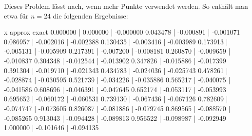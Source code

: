 Dieses Problem lässt nach, wenn mehr Punkte verwendet werden.
So enthält man etwa für $n = 24$ die folgenden Ergebnisse:
\begin{consoleoutput}
x                  approx          exact
0.000000        | 0.000000      | -0.000000
0.043478        | -0.000891     | -0.001071
0.086957        | -0.002016     | -0.002388
0.130435        | -0.003416     | -0.003989
0.173913        | -0.005131     | -0.005909
0.217391        | -0.007200     | -0.008181
0.260870        | -0.009659     | -0.010837
0.304348        | -0.012544     | -0.013902
0.347826        | -0.015886     | -0.017399
0.391304        | -0.019710     | -0.021343
0.434783        | -0.024036     | -0.025743
0.478261        | -0.028874     | -0.030595
0.521739        | -0.034226     | -0.035886
0.565217        | -0.040075     | -0.041586
0.608696        | -0.046391     | -0.047645
0.652174        | -0.053117     | -0.053993
0.695652        | -0.060172     | -0.060531
0.739130        | -0.067436     | -0.067126
0.782609        | -0.074747     | -0.073605
0.826087        | -0.081886     | -0.079745
0.869565        | -0.088570     | -0.085265
0.913043        | -0.094428     | -0.089813
0.956522        | -0.098987     | -0.092949
1.000000        | -0.101646     | -0.094135
\end{consoleoutput}
